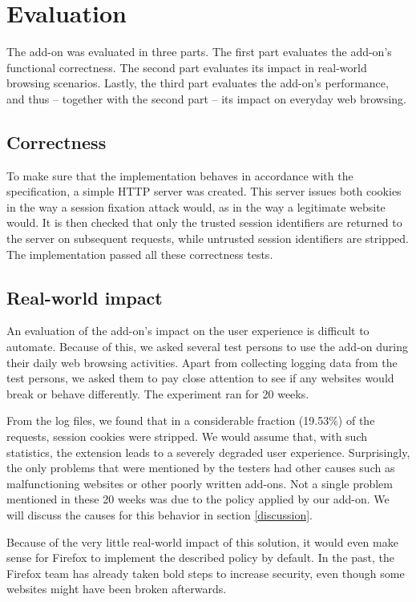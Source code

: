 \section{Evaluation}\label{evaluation}

The add-on was evaluated in three parts. The first part evaluates the add-on's functional correctness. The second part evaluates its impact in real-world browsing scenarios. Lastly, the third part evaluates the add-on's performance, and thus -- together with the second part -- its impact on everyday web browsing.

\subsection{Correctness}

To make sure that the implementation behaves in accordance with the specification, a simple HTTP server was created. This server issues both cookies in the way a session fixation attack would, as in the way a legitimate website would. It is then checked that only the trusted session identifiers are returned to the server on subsequent requests, while untrusted session identifiers are stripped. The implementation passed all these correctness tests.

\subsection{Real-world impact}

An evaluation of the add-on's impact on the user experience is difficult to automate. Because of this, we asked several test persons to use the add-on during their daily web browsing activities. Apart from collecting logging data from the test persons, we asked them to pay close attention to see if any websites would break or behave differently. The experiment ran for 20 weeks.

From the log files, we found that in a considerable fraction (19.53\%) of the requests, session cookies were stripped. We would assume that, with such statistics, the extension leads to a severely degraded user experience. Surprisingly, the only problems that were mentioned by the testers had other causes such as malfunctioning websites or other poorly written add-ons. Not a single problem mentioned in these 20 weeks was due to the policy applied by our add-on. We will discuss the causes for this behavior in section \ref{discussion}.

Because of the very little real-world impact of this solution, it would even make sense for Firefox to implement the described policy by default. In the past, the Firefox team has already taken bold steps to increase security, even though some websites might have been broken afterwards. \cite{Singh2010,MozillaXmlHttp,Bonne2011}

